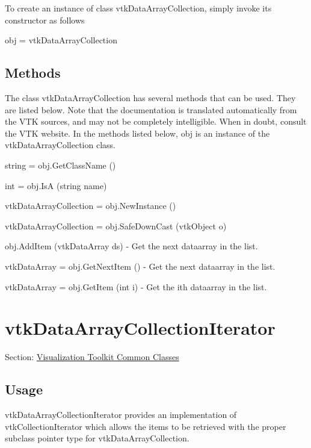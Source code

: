 To create an instance of class vtk\-Data\-Array\-Collection, simply invoke its constructor as follows \begin{DoxyVerb}  obj = vtkDataArrayCollection
\end{DoxyVerb}
 \hypertarget{vtkwidgets_vtkxyplotwidget_Methods}{}\subsection{Methods}\label{vtkwidgets_vtkxyplotwidget_Methods}
The class vtk\-Data\-Array\-Collection has several methods that can be used. They are listed below. Note that the documentation is translated automatically from the V\-T\-K sources, and may not be completely intelligible. When in doubt, consult the V\-T\-K website. In the methods listed below, {\ttfamily obj} is an instance of the vtk\-Data\-Array\-Collection class. 
\begin{DoxyItemize}
\item {\ttfamily string = obj.\-Get\-Class\-Name ()}  
\item {\ttfamily int = obj.\-Is\-A (string name)}  
\item {\ttfamily vtk\-Data\-Array\-Collection = obj.\-New\-Instance ()}  
\item {\ttfamily vtk\-Data\-Array\-Collection = obj.\-Safe\-Down\-Cast (vtk\-Object o)}  
\item {\ttfamily obj.\-Add\-Item (vtk\-Data\-Array ds)} -\/ Get the next dataarray in the list.  
\item {\ttfamily vtk\-Data\-Array = obj.\-Get\-Next\-Item ()} -\/ Get the next dataarray in the list.  
\item {\ttfamily vtk\-Data\-Array = obj.\-Get\-Item (int i)} -\/ Get the ith dataarray in the list.  
\end{DoxyItemize}\hypertarget{vtkcommon_vtkdataarraycollectioniterator}{}\section{vtk\-Data\-Array\-Collection\-Iterator}\label{vtkcommon_vtkdataarraycollectioniterator}
Section\-: \hyperlink{sec_vtkcommon}{Visualization Toolkit Common Classes} \hypertarget{vtkwidgets_vtkxyplotwidget_Usage}{}\subsection{Usage}\label{vtkwidgets_vtkxyplotwidget_Usage}
vtk\-Data\-Array\-Collection\-Iterator provides an implementation of vtk\-Collection\-Iterator which allows the items to be retrieved with the proper subclass pointer type for vtk\-Data\-Array\-Collection.

